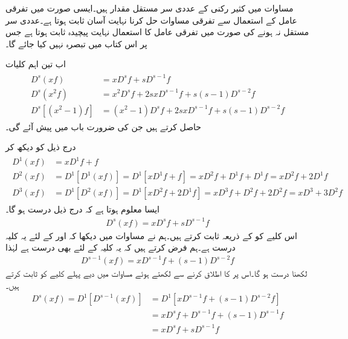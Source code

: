 مساوات  میں کثیر رکنی کے عددی سر مستقل مقدار ہیں۔ایسی صورت میں تفرقی عامل کے استعمال سے تفرقی مساوات حل کرنا نہایت آسان ثابت ہوتا ہے۔عددی سر مستقل نہ ہونے کی صورت میں تفرقی عامل کا استعمال نہایت پیچیدہ ثابت ہوتا ہے جس پر اس کتاب میں تبصرہ نہیں کیا جائے گا۔


اب تین اہم کلیات
\begin{gather}\label{مساوات_دوسرا_عامل_کلیات}
\begin{aligned}
D^s(xf)&=xD^sf+sD^{s-1}f \\
D^s(x^2f)&=x^2D^s f+2sxD^{s-1}f+s(s-1)D^{s-2}f  \\
D^s[(x^2-1)f]&=(x^2-1)D^sf+2sxD^{s-1}f+s(s-1)D^{s-2}f
\end{aligned}
\end{gather}
حاصل کرتے ہیں جن کی ضرورت باب  میں پیش آئے گی۔

درج ذیل کو دیکھ کر
\begin{gather}\label{مساوات_دوسری_تفرقی_عامل_کلیہ_الف}
\begin{aligned}
D^1(xf)&=xD^1f+f\\
D^2(xf)&=D^1[D^1(xf)]=D^1[xD^1f+f]=xD^2f+D^1f+D^1f=xD^2f+2D^1f\\
D^3(xf)&=D^1[D^2(xf)]=D^1[xD^2f+2D^1f]=xD^3f+D^2f+2D^2f=xD^3+3D^2f
\end{aligned}
\end{gather}
ایسا معلوم ہوتا ہے کہ درج ذیل درست ہو گا۔
\begin{align}
D^s(xf)=xD^sf+sD^{s-1}f
\end{align}
اس کلیے کو  کے ذریعہ ثابت کرتے ہیں۔ہم نے مساوات  میں دیکھا کہ  اور  کے لئے یہ کلیہ درست ہے۔ہم فرض کرتے ہیں کہ یہ کلیہ  کے لئے بھی درست ہے لہٰذا
\begin{align}
D^{s-1}(xf)=xD^{s-1}f+(s-1)D^{s-2}f
\end{align}
لکھنا درست ہو گا۔اس پر  کا اطلاق کرنے سے  لکھتے ہوئے مساوات  میں دیے پہلے کلیے کو ثابت کرتے ہیں۔
\begin{align*}
D^s(xf)=D^1[D^{s-1}(xf)]&=D^1[xD^{s-1}f+(s-1)D^{s-2}f]\\
&=xD^sf+D^{s-1}f+(s-1)D^{s-1}f\\
&=xD^sf+sD^{s-1}f
\end{align*}

